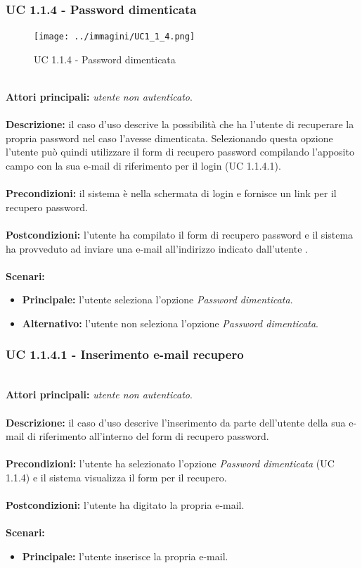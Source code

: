 \documentclass[a4paper,11pt]{article}
\begin{document}
\newpage

\subsubsection{UC 1.1.4 - Password dimenticata}
\begin{figure}[h!]
\centering
\texttt{[image: ../immagini/UC1\_1\_4.png]}
\caption{UC 1.1.4 - Password dimenticata}
\end{figure}
\ \\
\textbf{Attori principali:} \textit{utente non autenticato}.\\
\\
\textbf{Descrizione:} il caso d'uso descrive la possibilità che ha l'utente di recuperare la propria password nel caso l'avesse dimenticata. Selezionando questa opzione l'utente può quindi utilizzare il form di recupero password compilando l'apposito campo con la sua e-mail di riferimento per il login (UC 1.1.4.1). \\
\\
\textbf{Precondizioni:} il sistema è nella schermata di login e fornisce un link per il recupero password.\\
\\
\textbf{Postcondizioni:} l'utente ha compilato il form di recupero password e il sistema ha provveduto ad inviare una e-mail all'indirizzo indicato dall'utente . \\
\\
\textbf{Scenari:}
\begin{itemize}
\item \textbf{Principale:} l'utente seleziona l'opzione \textit{Password dimenticata}.
\item \textbf{Alternativo:} l'utente non seleziona l'opzione \textit{Password dimenticata}.
\end{itemize}

\vspace{6 mm}

\subsubsection{UC 1.1.4.1 - Inserimento e-mail recupero}
\ \\
\textbf{Attori principali:} \textit{utente non autenticato}.\\
\\
\textbf{Descrizione:} il caso d'uso descrive l'inserimento da parte dell'utente della sua e-mail di riferimento all'interno del form di recupero password. \\
\\
\textbf{Precondizioni:} l'utente ha selezionato l'opzione \textit{Password dimenticata} (UC 1.1.4) e il sistema visualizza il form per il recupero. \\
\\
\textbf{Postcondizioni:} l'utente ha digitato la propria e-mail. \\
\\
\textbf{Scenari:}
\begin{itemize}
\item \textbf{Principale:} l'utente inserisce la propria e-mail.
\end{itemize}
\end{document}
